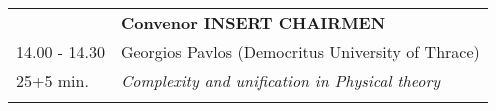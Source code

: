 \begin{longtable}{p{3cm}p{13cm}}
&\hfill {\bf Convenor INSERT CHAIRMEN }\\ 
14.00 - 14.30 & Georgios Pavlos (Democritus University of Thrace)\\ 
25+5 min. & {\it Complexity and unification in Physical theory}\\ 
 & \\ 
\end{longtable}

